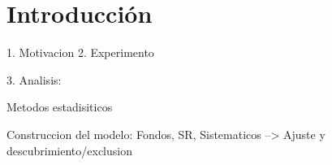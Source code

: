 \chapter*{Introducci\'on}

1. Motivacion
2. Experimento

3. Analisis:

Metodos estadisiticos

Construccion del modelo: Fondos, SR, Sistematicos  --> Ajuste y descubrimiento/exclusion
